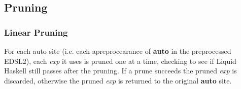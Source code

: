 \subsection{Pruning}
  
 \subsubsection{Linear Pruning}
  
 For each auto site (i.e. each apreprocearance of \textbf{auto} in the preprocessed EDSL2), each \textit{exp} it uses is pruned one at a time, checking to see if Liquid Haskell still passes after the pruning. If a prune succeeds the pruned \textit{exp} is discarded, otherwise the pruned \textit{exp} is returned to the original \textbf{auto} site.
